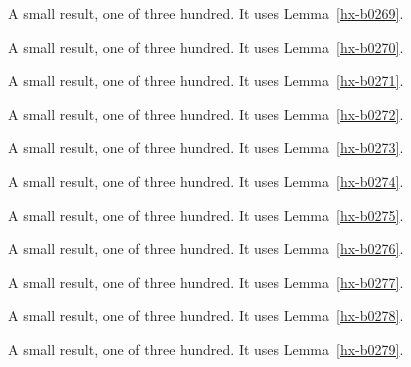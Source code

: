 \begin{lemma}[Bulk 270]\label{hx-b0270}
A small result, one of three hundred. It uses Lemma~\ref{hx-b0269}.
\end{lemma}

\begin{lemma}[Bulk 271]\label{hx-b0271}
A small result, one of three hundred. It uses Lemma~\ref{hx-b0270}.
\end{lemma}

\begin{lemma}[Bulk 272]\label{hx-b0272}
A small result, one of three hundred. It uses Lemma~\ref{hx-b0271}.
\end{lemma}

\begin{lemma}[Bulk 273]\label{hx-b0273}
A small result, one of three hundred. It uses Lemma~\ref{hx-b0272}.
\end{lemma}

\begin{lemma}[Bulk 274]\label{hx-b0274}
A small result, one of three hundred. It uses Lemma~\ref{hx-b0273}.
\end{lemma}

\begin{lemma}[Bulk 275]\label{hx-b0275}
A small result, one of three hundred. It uses Lemma~\ref{hx-b0274}.
\end{lemma}

\begin{lemma}[Bulk 276]\label{hx-b0276}
A small result, one of three hundred. It uses Lemma~\ref{hx-b0275}.
\end{lemma}

\begin{lemma}[Bulk 277]\label{hx-b0277}
A small result, one of three hundred. It uses Lemma~\ref{hx-b0276}.
\end{lemma}

\begin{lemma}[Bulk 278]\label{hx-b0278}
A small result, one of three hundred. It uses Lemma~\ref{hx-b0277}.
\end{lemma}

\begin{lemma}[Bulk 279]\label{hx-b0279}
A small result, one of three hundred. It uses Lemma~\ref{hx-b0278}.
\end{lemma}

\begin{lemma}[Bulk 280]\label{hx-b0280}
A small result, one of three hundred. It uses Lemma~\ref{hx-b0279}.
\end{lemma}

